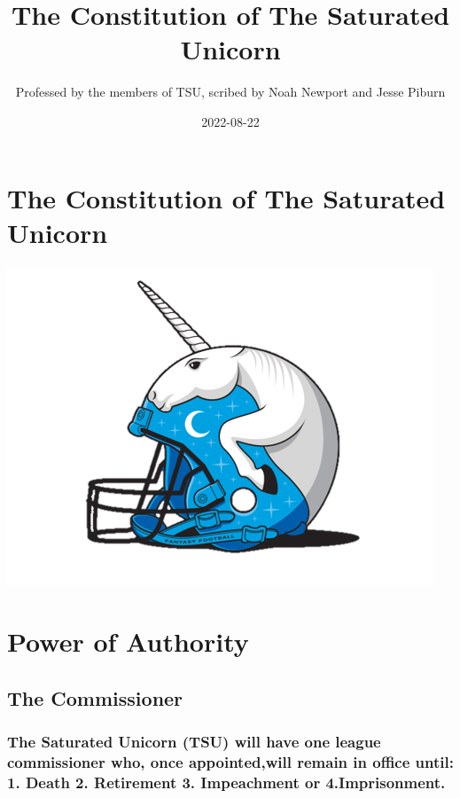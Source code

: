 \documentclass[
]{book}
\title{The Constitution of The Saturated Unicorn}
\author{Professed by the members of TSU, scribed by Noah Newport and Jesse Piburn}
\date{2022-08-22}
\begin{document}
\maketitle

{
\setcounter{tocdepth}{1}
\tableofcontents
}
\hypertarget{the-constitution-of-the-saturated-unicorn}{%
\chapter*{The Constitution of The Saturated Unicorn}\label{the-constitution-of-the-saturated-unicorn}}

\includegraphics[width=0.9\linewidth]{images/tsu-logo}

\hypertarget{power-of-authority}{%
\chapter{Power of Authority}\label{power-of-authority}}

\hypertarget{the-commissioner}{%
\section{The Commissioner}\label{the-commissioner}}

\hypertarget{the-saturated-unicorn-tsu-will-have-one-league-commissioner-who-once-appointedwill-remain-in-office-until-1.-death-2.-retirement-3.-impeachment-or-4.imprisonment.}{%
\subsection{The Saturated Unicorn (TSU) will have one league commissioner who, once appointed,will remain in office until: 1. Death 2. Retirement 3. Impeachment or 4.Imprisonment.}\label{the-saturated-unicorn-tsu-will-have-one-league-commissioner-who-once-appointedwill-remain-in-office-until-1.-death-2.-retirement-3.-impeachment-or-4.imprisonment.}}
\end{document}
